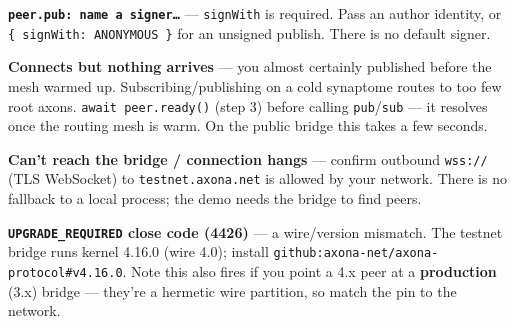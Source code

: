 \documentclass[
  nobib]{tufte-handout}
\begin{document}
\textbf{\texttt{peer.pub:\ name\ a\ signer…}} --- \texttt{signWith} is
required. Pass an author identity, or
\texttt{\{\ signWith:\ ANONYMOUS\ \}} for an unsigned publish. There is
no default signer.

\textbf{Connects but nothing arrives} --- you almost certainly published
before the mesh warmed up. Subscribing/publishing on a cold synaptome
routes to too few root axons. \texttt{await\ peer.ready()} (step 3)
before calling \texttt{pub}/\texttt{sub} --- it resolves once the
routing mesh is warm. On the public bridge this takes a few seconds.

\textbf{Can't reach the bridge / connection hangs} --- confirm outbound
\texttt{wss://} (TLS WebSocket) to \texttt{testnet.axona.net} is allowed
by your network. There is no fallback to a local process; the demo needs
the bridge to find peers.

\textbf{\texttt{UPGRADE\_REQUIRED} close code (4426)} --- a wire/version
mismatch. The testnet bridge runs kernel 4.16.0 (wire 4.0); install
\texttt{github:axona-net/axona-protocol\#v4.16.0}. Note this also fires
if you point a 4.x peer at a \textbf{production} (3.x) bridge ---
they're a hermetic wire partition, so match the pin to the network.
\end{document}
